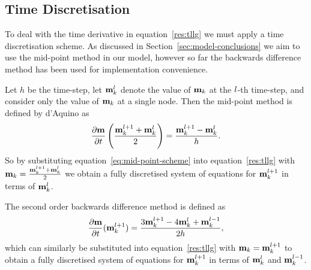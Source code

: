 
\subsection{Time Discretisation}
\label{sec:time-discretisation-resi}

To deal with the time derivative in equation~\eqref{res:tllg} we must apply a time discretisation scheme. As discussed in Section~\ref{sec:model-conclusions} we aim to use the mid-point method in our model, however so far the backwards difference method has been used for implementation convenience.

Let $h$ be the time-step, let $\mathbf{m}_k^l$ denote the value of $\mathbf{m}_k$ at the $l$-th time-step, and consider only the value of $\mathbf{m}_k$ at a single node. Then the mid-point method is defined by d'Aquino\cite{DAquino2005} as
\begin{equation}
  \label{eq:mid-point-scheme}
  \frac{\partial \mathbf{m}}{\partial t} \left( \frac{\mathbf{m}_k^{l+1} + \mathbf{m}_k^l}{2} \right) = \frac{\mathbf{m}_k^{l+1} - \mathbf{m}_k^l}{ h}.
\end{equation}
So by substituting equation~\eqref{eq:mid-point-scheme} into equation~\eqref{res:tllg} with $\mathbf{m}_k = \frac{\mathbf{m}_k^{l+1} + \mathbf{m}^l_k}{2}$ we obtain a fully discretised system of equations for $\mathbf{m}_k^{l+1}$ in terms of $\mathbf{m}_k^l$.

The second order backwards difference method is defined as\cite{Atkinson2009}
\begin{equation}
  \label{eq:bdf2-scheme}
  \frac{\partial \mathbf{m}}{\partial t}(\mathbf{m}_k^{l+1}) = \frac{3 \mathbf{m}_k^{l+1} - 4 \mathbf{m}_k^{l} + \mathbf{m}_k^{l-1}}{2h},
\end{equation}
which can similarly be substituted into equation~\eqref{res:tllg} with $\mathbf{m}_k = \mathbf{m}_k^{l+1}$ to obtain a fully discretised system of equations for $\mathbf{m}_k^{l+1}$ in terms of $\mathbf{m}_k^l$ and $\mathbf{m}_k^{l-1}$.

